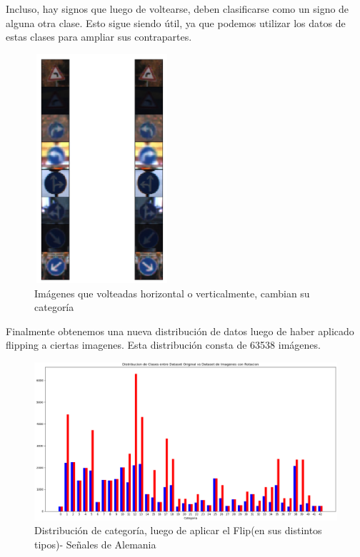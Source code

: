 			Incluso, hay signos que luego de voltearse, deben clasificarse como un signo de alguna otra clase. Esto sigue siendo útil, ya que podemos utilizar los datos de estas clases para ampliar sus contrapartes.
			\begin{figure}[H]
				\begin{center}
				\includegraphics[width=5cm ,height=8.5cm ]{images/desarrollo/Augment/cross_flippable}
				\end{center}
				\begin{center}
				\caption{\small{Imágenes que volteadas horizontal o verticalmente, cambian su categoría}}		
				{\small{\fontsize{10}{16.8}\selectfont {Fuente: Elaboración propia}}}
				\end{center}
				\vspace{-1.5em}
			\end{figure}


			Finalmente obtenemos una nueva distribución de datos luego de haber aplicado flipping a ciertas imagenes. Esta distribución consta de 63538 imágenes.
			\begin{figure}[H]
				\begin{center}
				\includegraphics[width=1\textwidth]{images/desarrollo/histograms/train_flipped63538}
				\end{center}
				\begin{center}
				\vspace{1em}
				\caption{\small{Distribución de categoría, luego de aplicar el Flip(en sus distintos tipos)- Señales de Alemania}}
				{\small{\fontsize{10}{16.8}\selectfont {Fuente: Elaboración propia}}}
				\end{center}
				\vspace{-1.5em}
			\end{figure}

